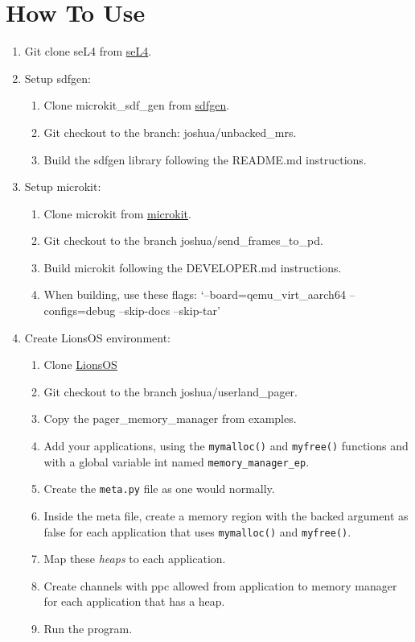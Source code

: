 \documentclass{article}
\begin{document}
\section{How To Use}
\begin{enumerate}
    \item Git clone seL4 from \href{https://github.com/SEL4/sel4}{seL4}.
    \item Setup sdfgen: \begin{enumerate}
        \item Clone microkit\_sdf\_gen from \href{https://github.com/au-ts/microkit_sdf_gen}{sdfgen}.
        \item Git checkout to the branch: joshua/unbacked\_mrs.
        \item Build the sdfgen library following the README.md instructions.
    \end{enumerate}
    \item Setup microkit: \begin{enumerate}
        \item Clone microkit from \href{git@github.com:au-ts/microkit.git}{microkit}.
        \item Git checkout to the branch joshua/send\_frames\_to\_pd.
        \item Build microkit following the DEVELOPER.md instructions.
        \item When building, use these flags: `--board=qemu\_virt\_aarch64 --configs=debug --skip-docs --skip-tar'
    \end{enumerate}
    \item Create LionsOS environment: \begin{enumerate}
        \item Clone \href{https://github.com/au-ts/lionsos}{LionsOS} 
        \item Git checkout to the branch joshua/userland\_pager.
        \item Copy the pager\_memory\_manager from examples.
        \item Add your applications, using the \texttt{mymalloc()} and \texttt{myfree()} functions and with a global variable int named \texttt{memory\_manager\_ep}.
        \item Create the \texttt{meta.py} file as one would normally.
        \item Inside the meta file, create a memory region with the backed argument as false for each application that uses \texttt{mymalloc()} and \texttt{myfree()}.
        \item Map these \textit{heaps} to each application.
        \item Create channels with ppc allowed from application to memory manager for each application that has a heap.
        \item Run the program. 
    \end{enumerate}
    
\end{enumerate}
\end{document}
